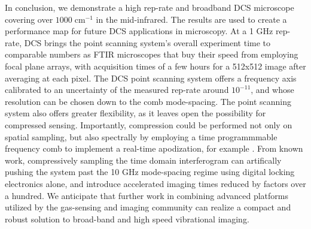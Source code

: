 \documentclass{optica-article}
\begin{document}
In conclusion, we demonstrate a high rep-rate and broadband DCS microscope covering over $1000 \; \mathrm{cm^{-1}}$ in the mid-infrared. The results are used to create a performance map for future DCS applications in microscopy. At a 1 GHz rep-rate, DCS brings the point scanning system's overall experiment time to comparable numbers as FTIR microscopes that buy their speed from employing focal plane arrays, with acquisition times of a few hours for a 512x512 image after averaging at each pixel. The DCS point scanning system offers a frequency axis calibrated to an uncertainty of the measured rep-rate around $\mathrm{10^{-11}}$, and whose resolution can be chosen down to the comb mode-spacing. The point scanning system also offers greater flexibility, as it leaves open the possibility for compressed sensing. Importantly, compression could be performed not only on spatial sampling, but also spectrally by employing a time programmmable frequency comb to implement a real-time apodization, for example \cite{tourigny-planteApodizationDualcombSpectroscopy2020,kawaiCompressiveDualcombSpectroscopy2021,caldwellTimeprogrammableFrequencyComb2022}. From known work, compressively sampling the time domain interferogram can artifically pushing the system past the 10 GHz mode-spacing regime using digital locking electronics alone, and introduce accelerated imaging times reduced by factors over a hundred. We anticipate that further work in combining advanced platforms utilized by the gas-sensing and imaging community can realize a compact and robust solution to broad-band and high speed vibrational imaging. 



\end{document}

